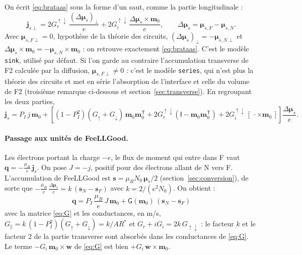 \documentclass[11pt,a4paper]{article}
\newcommand{\vm}{\bm{m}}
\newcommand{\vs}{\bm{s}}
\newcommand{\vq}{\bm{q}}
\newcommand{\mG}{\mathsf{G}}
\newcommand{\Id}{\mathsf{I}}
\begin{document}
On écrit \eqref{eq:brataas} sous la forme d'un saut, comme la partie
longitudinale :
\begin{equation}
  \bm{j}_{s\perp} = 2G_r^{\uparrow\downarrow}\,
    \frac{(\Delta\bm{\mu}_s)_\perp}{e}
  + 2G_i^{\uparrow\downarrow}\,\frac{\Delta\bm{\mu}_s\times\vm_0}{e},
  \qquad \Delta\bm{\mu}_s = \bm{\mu}_{s,F}-\bm{\mu}_{s,N}.
  \label{eq:transverse-saut}
\end{equation}
Avec $\bm{\mu}_{s,F\perp} = 0$, hypothèse de la théorie des circuits,
$(\Delta\bm{\mu}_s)_\perp = -\bm{\mu}_{s,N\perp}$ et
$\Delta\bm{\mu}_s\times\vm_0 = -\bm{\mu}_{s,N}\times\vm_0$ : on retrouve
exactement \eqref{eq:brataas}. C'est le modèle \texttt{sink}, utilisé par
défaut. Si l'on garde au contraire l'accumulation transverse de F2
calculée par la diffusion, $\bm{\mu}_{s,F\perp}\neq0$ : c'est le modèle
\texttt{series}, qui n'est plus la théorie des circuits et met en série
l'absorption de l'interface et celle du volume de F2 (troisième remarque
ci-dessous et section~\ref{sec:transverse}). En regroupant les deux
parties,
\begin{equation}
  \bm{j}_s = P_I\,j\,\vm_0
  + \left[(1-P_I^2)(G_\uparrow+G_\downarrow)\,\vm_0\vm_0^{\mathsf{T}}
  + 2G_r^{\uparrow\downarrow}\left(\Id-\vm_0\vm_0^{\mathsf{T}}\right)
  + 2G_i^{\uparrow\downarrow}\,[\,\cdot\times\vm_0\,]\right]
  \frac{\Delta\bm{\mu}_s}{e}.
\end{equation}

\paragraph{Passage aux unités de FeeLLGood.} Les électrons portant la
charge $-e$, le flux de moment qui entre dans F vaut
$\vq = -\frac{\mu_B}{e}\,\bm{j}_s$. On pose $J = -j$, positif pour des
électrons allant de N vers F. L'accumulation de FeeLLGood est
$\vs = \mu_BN_0\,\bm{\mu}_s/2$ (section~\ref{sec:conversion}), de sorte que
$-\frac{\mu_B}{e}\,\frac{\Delta\bm{\mu}_s}{e} = k\,(\vs_N-\vs_F)$ avec
$k = 2/(e^2N_0)$. On obtient :
\begin{equation}
  \boxed{\;
  \vq = P_I\,\frac{\mu_B}{e}\,J\,\vm_0
  + \mG(\vm_0)\,\left(\vs_N-\vs_F\right)
  \;}
  \label{eq:robin}
\end{equation}
avec la matrice \eqref{eq:G} et les conductances, en m/s,
$G_\parallel = k\,(1-P_I^2)(G_\uparrow+G_\downarrow) = k/AR^*$ et
$G_r + iG_i = 2k\,G_{\uparrow\downarrow}$ : le facteur $k$ et le facteur 2 de
la partie transverse sont absorbés dans les conductances de \eqref{eq:G}.
Le terme $-G_i\,\vm_0\times\bm{w}$ de \eqref{eq:G} est bien
$+G_i\,\bm{w}\times\vm_0$.
\end{document}
